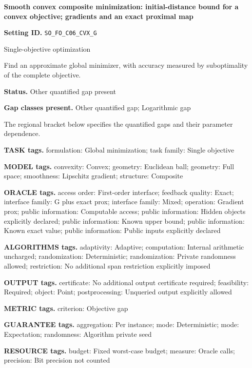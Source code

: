 \documentclass[10pt,a4paper]{article}
\begin{document}
\raggedright

{\LARGE\bfseries\sffamily\color{AtlasNavy} Smooth convex composite minimization: initial-distance bound for a convex objective; gradients and an exact proximal map\par}\vspace{5pt}
\textbf{Setting ID.} \texttt{SO\_\allowbreak{}FO\_\allowbreak{}C06\_\allowbreak{}CVX\_\allowbreak{}G}

Single-objective optimization

Find an approximate global minimizer, with accuracy measured by suboptimality of the complete objective.

\textbf{Status.} Other quantified gap present

\textbf{Gap classes present.} Other quantified gap; Logarithmic gap

The regional bracket below specifies the quantified gaps and their parameter dependence.

\textbf{TASK tags.} formulation: Global minimization; task family: Single objective

\textbf{MODEL tags.} convexity: Convex; geometry: Euclidean ball; geometry: Full space; smoothness: Lipschitz gradient; structure: Composite

\textbf{ORACLE tags.} access order: First-order interface; feedback quality: Exact; interface family: G plus exact prox; interface family: Mixed; operation: Gradient prox; public information: Computable access; public information: Hidden objects explicitly declared; public information: Known upper bound; public information: Known exact value; public information: Public inputs explicitly declared

\textbf{ALGORITHMS tags.} adaptivity: Adaptive; computation: Internal arithmetic uncharged; randomization: Deterministic; randomization: Private randomness allowed; restriction: No additional span restriction explicitly imposed

\textbf{OUTPUT tags.} certificate: No additional output certificate required; feasibility: Required; object: Point; postprocessing: Unqueried output explicitly allowed

\textbf{METRIC tags.} criterion: Objective gap

\textbf{GUARANTEE tags.} aggregation: Per instance; mode: Deterministic; mode: Expectation; randomness: Algorithm private seed

\textbf{RESOURCE tags.} budget: Fixed worst-case budget; measure: Oracle calls; precision: Bit precision not counted
\end{document}

